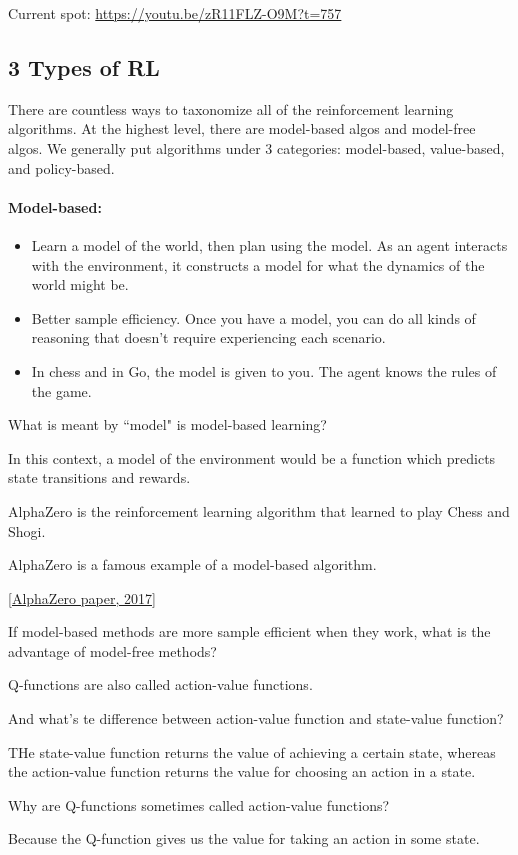 Current spot: \url{https://youtu.be/zR11FLZ-O9M?t=757}


\subsection*{3 Types of RL}
There are countless ways to taxonomize all of the reinforcement learning algorithms. At the highest level, there are model-based algos and model-free algos. We generally put algorithms under 3 categories: model-based, value-based, and policy-based. 

\paragraph*{Model-based: }
\begin{itemize}
	\item Learn a model of the world, then plan using the model. As an agent interacts with the environment, it constructs a model for what the dynamics of the world might be. 
	\item Better sample efficiency. Once you have a model, you can do all kinds of reasoning that doesn't require experiencing each scenario.  
	\item In chess and in Go, the model is given to you. The agent knows the rules of the game. 
\end{itemize}

\begin{quest}
	\item What is meant by ``model" is model-based learning? 
	\begin{ans}
		In this context,  a model of the environment would be a function which predicts state transitions and rewards.
	\end{ans}
	
	\cloze AlphaZero is the reinforcement learning algorithm that learned to play Chess and Shogi. 

	\cloze AlphaZero is a famous example of a model-based algorithm. 

	\href{https://arxiv.org/pdf/1712.01815.pdf}{[AlphaZero paper, 2017]}

	\item If model-based methods are more sample efficient when they work, what is the advantage of model-free methods?
	\item \cloze Q-functions are also called action-value functions. 
	
	\item And what's te difference between action-value function and state-value function?
	\begin{ans}
		THe state-value function returns the value of achieving a certain state, whereas the action-value function returns the value for choosing an action in a state. 
	\end{ans}
	
	\item Why are Q-functions sometimes called action-value functions?
	\begin{ans}
		Because the Q-function gives us the value for taking an action in some state. 
	\end{ans} 
\end{quest}

